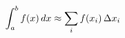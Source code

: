 \documentclass[preview]{standalone}
\begin{document}
\begin{align*}
\special{dvisvgm:raw <g id='unique000'>}\int_a^b f(x) \, dx \approx \sum_i f(x_i) \, \Delta x_i\special{dvisvgm:raw </g>}
\end{align*}
\end{document}
